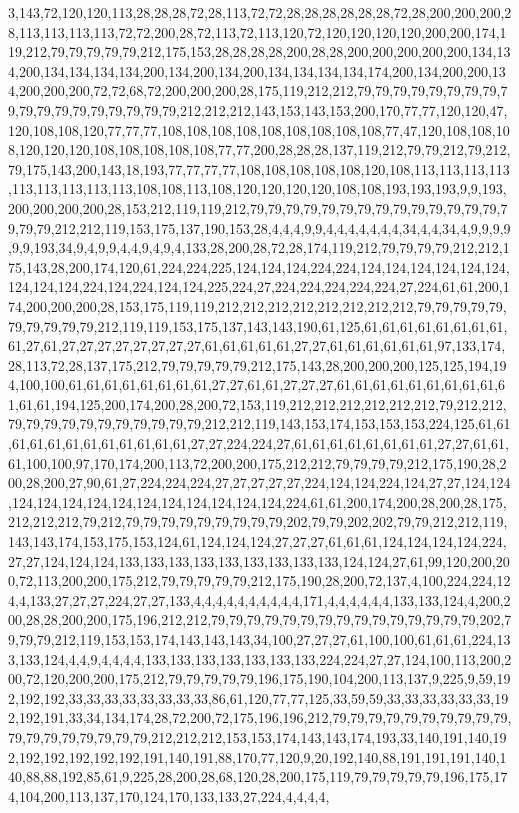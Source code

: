 3,143,72,120,120,113,28,28,28,72,28,113,72,72,28,28,28,28,28,28,72,28,200,200,200,28,113,113,113,113,72,72,200,28,72,113,72,113,120,72,120,120,120,120,200,200,174,119,212,79,79,79,79,79,212,175,153,28,28,28,28,200,28,28,200,200,200,200,200,134,134,200,134,134,134,134,200,134,200,134,200,134,134,134,134,174,200,134,200,200,134,200,200,200,72,72,68,72,200,200,200,28,175,119,212,212,79,79,79,79,79,79,79,79,79,79,79,79,79,79,79,79,79,79,212,212,212,143,153,143,153,200,170,77,77,120,120,47,120,108,108,120,77,77,77,108,108,108,108,108,108,108,108,108,77,47,120,108,108,108,120,120,120,108,108,108,108,108,77,77,200,28,28,28,137,119,212,79,79,212,79,212,79,175,143,200,143,18,193,77,77,77,77,108,108,108,108,108,120,108,113,113,113,113,113,113,113,113,113,108,108,113,108,120,120,120,120,108,108,193,193,193,9,9,193,200,200,200,200,28,153,212,119,119,212,79,79,79,79,79,79,79,79,79,79,79,79,79,79,79,79,79,212,212,119,153,175,137,190,153,28,4,4,4,9,9,4,4,4,4,4,4,4,34,4,4,34,4,9,9,9,9,9,9,193,34,9,4,9,9,4,4,9,4,9,4,133,28,200,28,72,28,174,119,212,79,79,79,79,212,212,175,143,28,200,174,120,61,224,224,225,124,124,124,224,224,124,124,124,124,124,124,124,124,124,224,124,224,124,124,225,224,27,224,224,224,224,224,27,224,61,61,200,174,200,200,200,28,153,175,119,119,212,212,212,212,212,212,212,212,79,79,79,79,79,79,79,79,79,79,212,119,119,153,175,137,143,143,190,61,125,61,61,61,61,61,61,61,61,61,27,61,27,27,27,27,27,27,27,27,61,61,61,61,61,27,27,61,61,61,61,61,61,97,133,174,28,113,72,28,137,175,212,79,79,79,79,79,212,175,143,28,200,200,200,125,125,194,194,100,100,61,61,61,61,61,61,61,61,27,27,61,61,27,27,27,61,61,61,61,61,61,61,61,61,61,61,61,194,125,200,174,200,28,200,72,153,119,212,212,212,212,212,212,79,212,212,79,79,79,79,79,79,79,79,79,79,79,212,212,119,143,153,174,153,153,153,224,125,61,61,61,61,61,61,61,61,61,61,61,61,27,27,224,224,27,61,61,61,61,61,61,61,61,27,27,61,61,61,100,100,97,170,174,200,113,72,200,200,175,212,212,79,79,79,79,212,175,190,28,200,28,200,27,90,61,27,224,224,224,27,27,27,27,27,224,124,124,224,124,27,27,124,124,124,124,124,124,124,124,124,124,124,124,124,224,61,61,200,174,200,28,200,28,175,212,212,212,79,212,79,79,79,79,79,79,79,79,79,202,79,79,202,202,79,79,212,212,119,143,143,174,153,175,153,124,61,124,124,124,27,27,27,61,61,61,124,124,124,124,224,27,27,124,124,124,133,133,133,133,133,133,133,133,133,124,124,27,61,99,120,200,200,72,113,200,200,175,212,79,79,79,79,79,212,175,190,28,200,72,137,4,100,224,224,124,4,133,27,27,27,224,27,27,133,4,4,4,4,4,4,4,4,4,4,171,4,4,4,4,4,4,133,133,124,4,200,200,28,28,200,200,175,196,212,212,79,79,79,79,79,79,79,79,79,79,79,79,79,79,79,202,79,79,79,212,119,153,153,174,143,143,143,34,100,27,27,27,61,100,100,61,61,61,224,133,133,124,4,4,9,4,4,4,4,133,133,133,133,133,133,133,224,224,27,27,124,100,113,200,200,72,120,200,200,175,212,79,79,79,79,79,196,175,190,104,200,113,137,9,225,9,59,192,192,192,33,33,33,33,33,33,33,33,86,61,120,77,77,125,33,59,59,33,33,33,33,33,33,192,192,191,33,34,134,174,28,72,200,72,175,196,196,212,79,79,79,79,79,79,79,79,79,79,79,79,79,79,79,79,79,79,212,212,212,153,153,174,143,143,174,193,33,140,191,140,192,192,192,192,192,192,191,140,191,88,170,77,120,9,20,192,140,88,191,191,191,140,140,88,88,192,85,61,9,225,28,200,28,68,120,28,200,175,119,79,79,79,79,79,196,175,174,104,200,113,137,170,124,170,133,133,27,224,4,4,4,4,